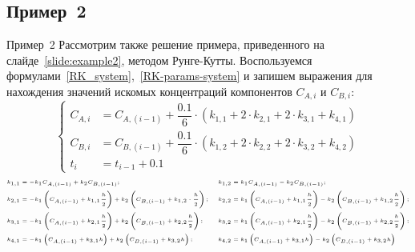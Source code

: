 \documentclass[aspectratio=169, mathserif]{beamer}	%
\begin{document}
\subsection{Пример~2}
\begin{frame}[fragile, label=c]{Пример~2}
\scriptsize
Рассмотрим также решение примера, приведенного на слайде~\ref{slide:example2}, методом Рунге-Кутты.
Воспользуемся формулами~\eqref{RK_system},~\eqref{RK-params-system} и запишем выражения для нахождения значений искомых концентраций компонентов $C_{A,i}$ и $C_{B,i}$:
\vfill
\begin{equation*}
	\left\{
	\begin{aligned}
		C_{A,i} &= C_{A,(i-1)} + \dfrac{0.1}{6} \cdot \left(k_{1,1} + 2\cdot k_{2,1} + 2 \cdot k_{3,1} + k_{4,1}\right) \\
		C_{B,i} &= C_{B,(i-1)} + \dfrac{0.1}{6} \cdot \left(k_{1,2} + 2\cdot k_{2,2} + 2 \cdot k_{3,2} + k_{4,2}\right) \\
		t_{i} &= t_{i-1} + 0.1
	\end{aligned}
	\right.
\end{equation*}
\vfill
\begin{equation*}
	\begin{tiny}
		\begin{aligned}
			k_{1,1} &= -k_1  C_{A,(i-1)} + k_2  C_{B,(i-1)}; &
			k_{1,2} &= k_1  C_{A,(i-1)} - k_2  C_{B,(i-1)}; \\
			k_{2,1} &= -k_1  \left(C_{A,(i-1)} + k_{1,1}  \dfrac{h}{2}\right) + k_2  \left(C_{B,(i-1)}+ k_{1,2} \cdot \dfrac{h}{2}\right); &
			k_{2,2} &= k_1 \left(C_{A,(i-1)} + k_{1,1} \dfrac{h}{2}\right) - k_2 \left(C_{B,(i-1)}+ k_{1,2}  \dfrac{h}{2}\right); \\
			k_{3,1} &= -k_1  \left(C_{A,(i-1)} + k_{2,1}  \dfrac{h}{2}\right) + k_2  \left(C_{B,(i-1)}+ k_{2,2}  \dfrac{h}{2}\right); &
			k_{3,2} &= k_1  \left(C_{A,(i-1)} + k_{2,1}  \dfrac{h}{2}\right) - k_2  \left(C_{B,(i-1)}+ k_{2,2}  \dfrac{h}{2}\right); \\
			k_{4,1} &= -k_1  \left(C_{A,(i-1)} + k_{3,1}  h\right) + k_2  \left(C_{B,(i-1)}+ k_{3,2}  h\right); &
			k_{4,2} &= k_1  \left(C_{A,(i-1)} + k_{3,1}  h\right) - k_2  \left(C_{B,(i-1)}+ k_{3,2}  h\right) \\
		\end{aligned}
	\end{tiny}
\end{equation*}
\vfill
\end{frame}
\end{document}
